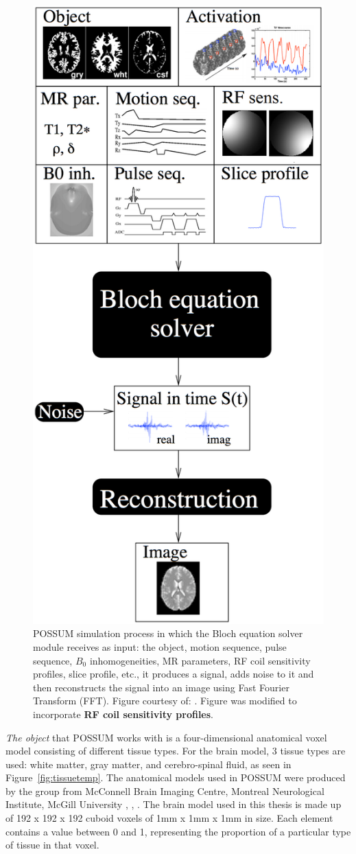 \begin{figure}[H]
    \centering
    \includegraphics[width=.7\textwidth,keepaspectratio]{possumsim2}
    \caption{POSSUM simulation process in which the Bloch equation solver module receives as input: the object, motion sequence, pulse sequence, $B_0$ inhomogeneities, MR parameters, RF coil sensitivity profiles, slice profile, etc., it produces a signal, adds noise to it and then reconstructs the signal into an image using Fast Fourier Transform (FFT). Figure courtesy of: \cite{Drobnjak07}. Figure was modified to incorporate \textbf{RF coil sensitivity profiles}.}
    \label{fig:possumsim}
\end{figure}

\textit{The object} that POSSUM works with is a four-dimensional anatomical voxel model consisting of different tissue types. For the brain model, 3 tissue types are used: white matter, gray matter, and cerebro-spinal fluid, as seen in Figure~\ref{fig:tissuetemp}. The anatomical models used in POSSUM were produced by the group from McConnell Brain Imaging Centre, Montreal Neurological Institute, McGill University \cite{Kwan1999}, \cite{Cocosco1996}, \cite{Collins1998}. The brain model used in this thesis is made up of 192 x 192 x 192 cuboid voxels of 1mm x 1mm x 1mm in size. Each element contains a value between 0 and 1, representing the proportion of a particular type of tissue in that voxel.

